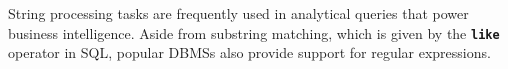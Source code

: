 \chapter{\abstractname}
String processing tasks are frequently used in analytical queries that power business intelligence. Aside from substring matching, which is given by the \texttt{\textbf{like}} operator in SQL, popular DBMSs also provide support for regular expressions.


